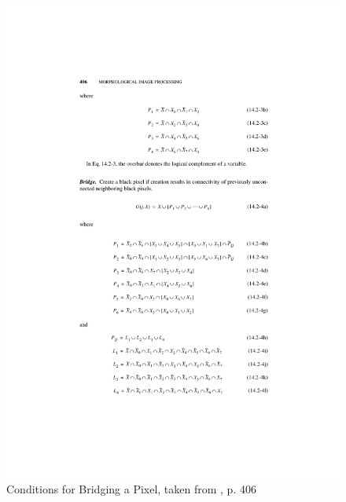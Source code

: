 \documentclass{article}
\begin{document}
\begin{figure}
 \includegraphics{images/bridge.pdf}
 \caption{Conditions for Bridging a Pixel, taken from \cite{Pratt:2001:DIP:516234}, p. 406}
 \label{fig:bridge}
\end{figure}
\end{document}

